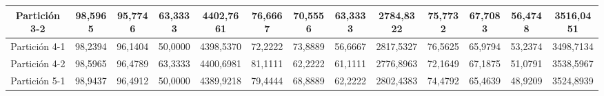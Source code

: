 \documentclass[12pt]{article}
\begin{document}
\begin{table}[H]
{\begin{tabular}{|c|cccc|cccc|cccc|}
Partición 3-2 & \multicolumn{1}{c|}{98,5965}                                                  & \multicolumn{1}{c|}{95,7746}                                                 & \multicolumn{1}{c|}{63,3333} & 4402,7661 & \multicolumn{1}{c|}{76,6667}                                                  & \multicolumn{1}{c|}{70,5556}                                                 & \multicolumn{1}{c|}{63,3333} & 2784,8322 & \multicolumn{1}{c|}{75,7732}                                                  & \multicolumn{1}{c|}{67,7083}                                                 & \multicolumn{1}{c|}{56,4748} & 3516,0451 \\ \hline
Partición 4-1 & \multicolumn{1}{c|}{98,2394}                                                  & \multicolumn{1}{c|}{96,1404}                                                 & \multicolumn{1}{c|}{50,0000} & 4398,5370 & \multicolumn{1}{c|}{72,2222}                                                  & \multicolumn{1}{c|}{73,8889}                                                 & \multicolumn{1}{c|}{56,6667} & 2817,5327 & \multicolumn{1}{c|}{76,5625}                                                  & \multicolumn{1}{c|}{65,9794}                                                 & \multicolumn{1}{c|}{53,2374} & 3498,7134 \\ \hline
Partición 4-2 & \multicolumn{1}{c|}{98,5965}                                                  & \multicolumn{1}{c|}{96,4789}                                                 & \multicolumn{1}{c|}{63,3333} & 4400,6981 & \multicolumn{1}{c|}{81,1111}                                                  & \multicolumn{1}{c|}{62,2222}                                                 & \multicolumn{1}{c|}{61,1111} & 2776,8963 & \multicolumn{1}{c|}{72,1649}                                                  & \multicolumn{1}{c|}{67,1875}                                                 & \multicolumn{1}{c|}{51,0791} & 3538,5967 \\ \hline
Partición 5-1 & \multicolumn{1}{c|}{98,9437}                                                  & \multicolumn{1}{c|}{96,4912}                                                 & \multicolumn{1}{c|}{50,0000} & 4389,9218 & \multicolumn{1}{c|}{79,4444}                                                  & \multicolumn{1}{c|}{68,8889}                                                 & \multicolumn{1}{c|}{62,2222} & 2802,4383 & \multicolumn{1}{c|}{74,4792}                                                  & \multicolumn{1}{c|}{65,4639}                                                 & \multicolumn{1}{c|}{48,9209} & 3524,8939 \\ \hline

\end{tabular}}
\end{table}
\end{document}

